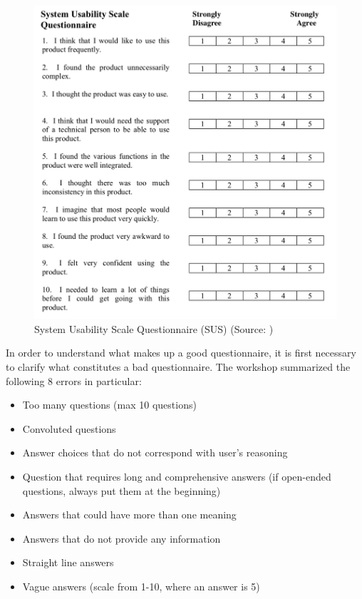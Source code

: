 \documentclass[a4paper,10pt,twoside]{article}
\begin{document}
\vspace{0.3cm}
\begin{figure}[hbt!] 
\begin{center}
\includegraphics[width=14cm]{../pictures/sus.png} 
\caption[System Usability Scale Questionnaire (SUS) ]{System Usability Scale Questionnaire (SUS) (Source: \cite{sus})}
\label{fig:sus}
\end{center}
\end{figure}

\newpage
\noindent In order to understand what makes up a good questionnaire,
it is first necessary to clarify what constitutes a bad
questionnaire. The workshop summarized the following 8 errors in
particular:

\begin{itemize}
\item Too many questions (max 10 questions)
\item Convoluted questions
\item Answer choices that do not correspond with user's reasoning
\item Question that requires long and comprehensive answers (if open-ended questions, always put them at the beginning)
\item Answers that could have more than one meaning
\item Answers that do not provide any information
\item Straight line answers
\item Vague answers (scale from 1-10, where an answer is 5)
\end{itemize}
\end{document}
